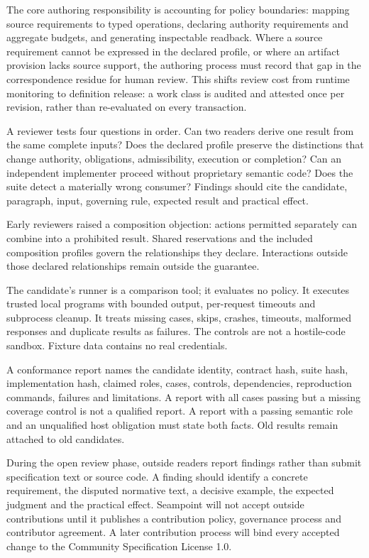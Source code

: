 \documentclass[
  american,
  11pt,
  letterpaper,
]{article}
\begin{document}
The core authoring responsibility is accounting for policy boundaries:
mapping source requirements to typed operations, declaring authority
requirements and aggregate budgets, and generating inspectable readback.
Where a source requirement cannot be expressed in the declared profile,
or where an artifact provision lacks source support, the authoring
process must record that gap in the correspondence residue for human
review. This shifts review cost from runtime monitoring to definition
release: a work class is audited and attested once per revision, rather
than re-evaluated on every transaction.

A reviewer tests four questions in order. Can two readers derive one
result from the same complete inputs? Does the declared profile preserve
the distinctions that change authority, obligations, admissibility,
execution or completion? Can an independent implementer proceed without
proprietary semantic code? Does the suite detect a materially wrong
consumer? Findings should cite the candidate, paragraph, input,
governing rule, expected result and practical effect.

Early reviewers raised a composition objection: actions permitted
separately can combine into a prohibited result. Shared reservations and
the included composition profiles govern the relationships they declare.
Interactions outside those declared relationships remain outside the
guarantee.

The candidate's runner is a comparison tool; it evaluates no policy. It
executes trusted local programs with bounded output, per-request
timeouts and subprocess cleanup. It treats missing cases, skips,
crashes, timeouts, malformed responses and duplicate results as
failures. The controls are not a hostile-code sandbox. Fixture data
contains no real credentials.

A conformance report names the candidate identity, contract hash, suite
hash, implementation hash, claimed roles, cases, controls, dependencies,
reproduction commands, failures and limitations. A report with all cases
passing but a missing coverage control is not a qualified report. A
report with a passing semantic role and an unqualified host obligation
must state both facts. Old results remain attached to old candidates.

During the open review phase, outside readers report findings rather
than submit specification text or source code. A finding should identify
a concrete requirement, the disputed normative text, a decisive example,
the expected judgment and the practical effect. Seampoint will not
accept outside contributions until it publishes a contribution policy,
governance process and contributor agreement. A later contribution
process will bind every accepted change to the Community Specification
License 1.0.
\end{document}
